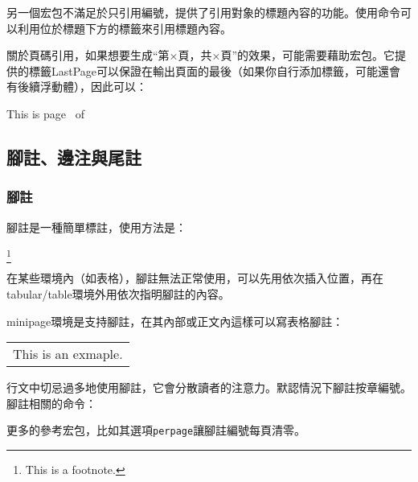 另一個宏包不滿足於只引用編號，提供了引用對象的標題內容的功能。使用命令可以利用位於標題下方的標籤來引用標題內容。

關於頁碼引用，如果想要生成“第$\times$頁，共$\times$頁”的效果，可能需要藉助宏包。它提供的標籤LastPage可以保證在輸出頁面的最後（如果你自行添加標籤，可能還會有後續浮動體），因此可以：

\begin{codeshow}
This is page \thepage\ of \pageref{LastPage}
\end{codeshow}

\subsection{腳註、邊注與尾註}
\subsubsection{腳註}
腳註是一種簡單標註，使用方法是：
\begin{latex}
\footnote{This is a footnote.}
\end{latex}

在某些環境內（如表格），腳註無法正常使用，可以先用依次插入位置，再在tabular/table環境外用依次指明腳註的內容。

minipage環境是支持腳註，在其內部或正文內這樣可以寫表格腳註：

\begin{codeshow}
\begin{minipage}{\linewidth}
\begin{tabular}{l}
This is an exmaple\footnotemark. 
\end{tabular}
\end{minipage}
\end{codeshow}

行文中切忌過多地使用腳註，它會分散讀者的注意力。默認情況下腳註按章編號。腳註相關的命令：
\begin{latex}
\caption{Title\protect\footnote{This is footnote.}}
\renewcommand\footnoterule{\rule{0.4\columnwidth}{0.4pt}}
\setlength{\skip\footins}{0.5cm}
\end{latex}

更多的參考宏包，比如其選項\texttt{perpage}讓腳註編號每頁清零。

